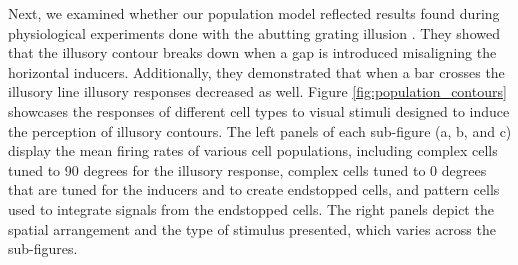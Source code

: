 \documentclass[12pt]{article}
\begin{document}
Next, we examined whether our population model reflected results found during physiological experiments done with the abutting grating illusion \autocite{vonderheydtMechanismsContourPerception1989}. They showed that the illusory contour breaks down when a gap is introduced misaligning the horizontal inducers. Additionally, they demonstrated that when a bar crosses the illusory line illusory responses decreased as well. Figure \ref{fig:population_contours} showcases the responses of different cell types to visual stimuli designed to induce the perception of illusory contours. The left panels of each sub-figure (a, b, and c) display the mean firing rates of various cell populations, including complex cells tuned to 90 degrees for the illusory response, complex cells tuned to 0 degrees that are tuned for the inducers and to create endstopped cells, and pattern cells used to integrate signals from the endstopped cells. The right panels depict the spatial arrangement and the type of stimulus presented, which varies across the sub-figures.
\bigbreak
\end{document}
